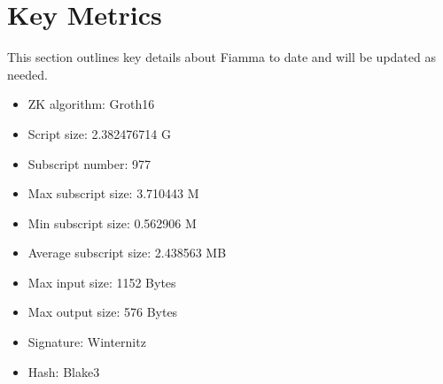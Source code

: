 \section{Key Metrics} \label{sec:Key Metrics}
This section outlines key details about Fiamma to date and will be updated as needed.

\begin{itemize}
\item ZK algorithm: Groth16 \cite{website:Groth16}
\item Script size: 2.382476714 G
\item Subscript number: 977
\item Max subscript size: 3.710443 M 
\item Min subscript size: 0.562906 M 
\item Average subscript size: 2.438563 MB
\item Max input size: 1152 Bytes
\item Max output size: 576 Bytes
\item Signature: Winternitz
\item Hash: Blake3
\end{itemize}
